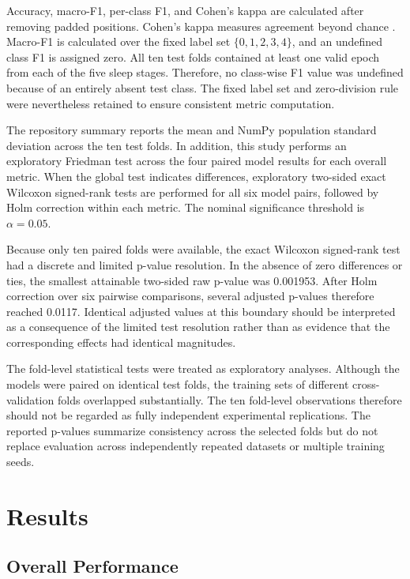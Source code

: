 \documentclass[conference]{IEEEtran}
\begin{document}
Accuracy, macro-F1, per-class F1, and Cohen's kappa are calculated after removing padded positions. Cohen's kappa measures agreement beyond chance \cite{cohen1960coefficient}. Macro-F1 is calculated over the fixed label set $\{0,1,2,3,4\}$, and an undefined class F1 is assigned zero. All ten test folds contained at least one valid epoch from each of the five sleep stages. Therefore, no class-wise F1 value was undefined because of an entirely absent test class. The fixed label set and zero-division rule were nevertheless retained to ensure consistent metric computation.

The repository summary reports the mean and NumPy population standard deviation across the ten test folds. In addition, this study performs an exploratory Friedman test across the four paired model results for each overall metric. When the global test indicates differences, exploratory two-sided exact Wilcoxon signed-rank tests are performed for all six model pairs, followed by Holm correction within each metric. The nominal significance threshold is $\alpha=0.05$.

Because only ten paired folds were available, the exact Wilcoxon signed-rank test had a discrete and limited p-value resolution. In the absence of zero differences or ties, the smallest attainable two-sided raw p-value was 0.001953. After Holm correction over six pairwise comparisons, several adjusted p-values therefore reached 0.0117. Identical adjusted values at this boundary should be interpreted as a consequence of the limited test resolution rather than as evidence that the corresponding effects had identical magnitudes.

The fold-level statistical tests were treated as exploratory analyses. Although the models were paired on identical test folds, the training sets of different cross-validation folds overlapped substantially. The ten fold-level observations therefore should not be regarded as fully independent experimental replications. The reported p-values summarize consistency across the selected folds but do not replace evaluation across independently repeated datasets or multiple training seeds.

\section{Results}

\subsection{Overall Performance}
\end{document}
